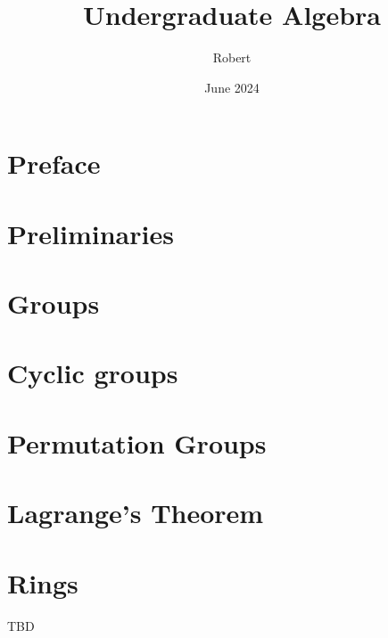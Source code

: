 \documentclass[oneside]{book}
\title{Undergraduate Algebra}
\author{Robert}
\date{June 2024}
\makeatletter
\edef\myauthor{\@author}
\edef\mytitle{\@title}
\makeatother
\begin{document}
\pagestyle{fancy}

\frontmatter
{}

\tableofcontents

\listoftheorems[ignoreall, show={theorem}]
\chapter*{Preface}


\mainmatter
\setcounter{chapter}{-1}
\chapter{Preliminaries}



\chapter{Groups}
\label{chapter:groups}


\chapter{Cyclic groups}
\label{chapter:cyclic-groups}


\chapter{Permutation Groups}
\label{chapter:permutation-groups}


\chapter{Lagrange's Theorem}
\label{chapter:lagrange-theorem}


\chapter{Rings}
TBD
 
\end{document}
